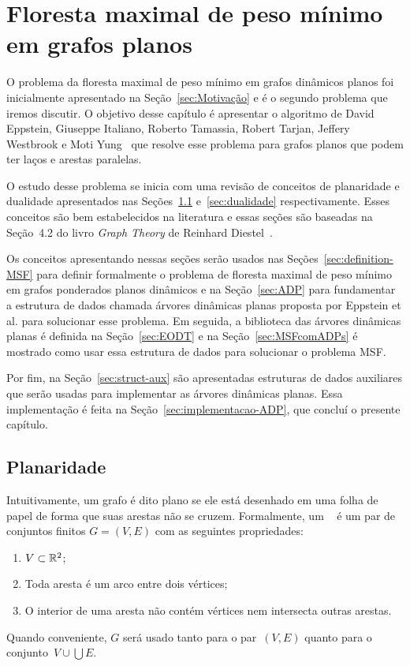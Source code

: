 \chapter{Floresta maximal de peso mínimo em grafos planos}
\label{sec:MSF}

O problema da floresta maximal de peso mínimo em grafos dinâmicos planos foi inicialmente apresentado na Seção~\ref{sec:Motivação} e é o segundo problema que iremos discutir.
O objetivo desse capítulo é apresentar o algoritmo de David Eppstein, Giuseppe Italiano, Roberto Tamassia, Robert Tarjan, Jeffery Westbrook e Moti Yung~\cite{EPPSTEIN-planar} que resolve esse problema para grafos planos que podem ter laços e arestas paralelas.

O estudo desse problema se inicia com uma revisão de conceitos de planaridade e dualidade apresentados nas Seções~\ref{sec:planaridade} e~\ref{sec:dualidade} respectivamente.
Esses conceitos são bem estabelecidos na literatura e essas seções são baseadas na Seção~4.2 do livro \textit{Graph Theory} de Reinhard Diestel~\cite{Diestel}.

Os conceitos apresentando nessas seções serão usados nas Seções~\ref{sec:definition-MSF} para definir formalmente o problema de floresta maximal de peso mínimo em grafos ponderados planos dinâmicos e na Seção~\ref{sec:ADP} para fundamentar a estrutura de dados chamada árvores dinâmicas planas proposta por Eppstein et al. para solucionar esse problema.
Em seguida, a biblioteca das árvores dinâmicas planas é definida na Seção~\ref{sec:EODT} e na Seção~\ref{sec:MSFcomADPs} é mostrado como usar essa estrutura de dados para solucionar o problema MSF.

Por fim, na Seção~\ref{sec:struct-aux} são apresentadas estruturas de dados auxiliares que serão usadas para implementar as árvores dinâmicas planas. Essa implementação é feita na Seção~\ref{sec:implementacao-ADP}, que concluí o presente capítulo.

\section{Planaridade}
\label{sec:planaridade}

Intuitivamente, um grafo é dito plano se ele está desenhado em uma folha de papel de forma que suas arestas não se cruzem.
Formalmente, um ~\cite{Diestel} é um par de conjuntos finitos $G = (V, E)$ com as seguintes propriedades:
\begin{enumerate}
\item $V\subset \mathbb{R}^2$;
\item Toda aresta é um arco entre dois vértices;
\item O interior de uma aresta não contém vértices nem intersecta outras arestas.
\end{enumerate}
Quando conveniente, $G$ será usado tanto para o par~$(V ,E)$ quanto para o conjunto~${V\cup\bigcup E}$.

